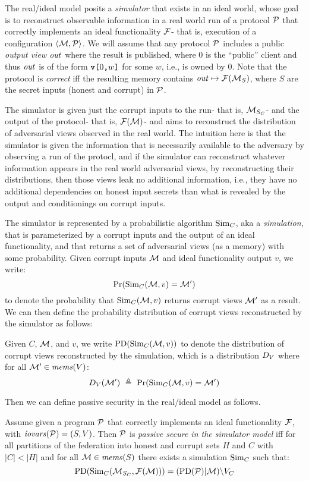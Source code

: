 The real/ideal model posits a \emph{simulator} that exists in an ideal
world, whose goal is to reconstruct observable information in a real
world run of a protocol $\mathcal{P}$ that correctly implements an ideal
functionality $\mathcal{F}$- that is, execution of a configuration
$\langle \mathcal{M},\mathcal{P} \rangle$. We will assume that any protocol $\mathcal{P}$
includes a public \emph{output view} $\mathit{out}$ where the result is
published, where $0$ is the ``public'' client and thus $\mathit{out}$
is of the form $\texttt{v[}0\texttt{,}w\texttt{]}$ for some $w$, i.e., is owned by 0.
Note that the protocol is \emph{correct} iff the resulting
memory contains $\mathit{out} \mapsto \mathcal{F}(\mathcal{M}_S)$, where $S$ are the
secret inputs (honest and corrupt) in $\mathcal{P}$.

The simulator is given just the corrupt inputs to the run- that is,
$\mathcal{M}_{S_C}$- and the output of the protocol- that is,
$\mathcal{F}(\mathcal{M})$- and aims to reconstruct the distribution of
adversarial views observed in the real world. The intuition here is
that the simulator is given the information that is necessarily
available to the adversary by observing a run of the protocl, and if
the simulator can reconstruct whatever information appears in the real
world adversarial views, by reconstructing their distributions, then
those views leak no additional information, i.e., they have no
additional dependencies on honest input secrets than what is revealed
by the output and conditionings on corrupt inputs.

The simulator is represented by a probabilistic algorithm $\mathrm{Sim}_C$,
aka a \emph{simulation}, that is parameterized by a corrupt inputs and
the output of an ideal functionality, and that returns a set of
adversarial views (as a memory) with some probability. Given
corrupt inputs $\mathcal{M}$ and ideal functionality output $v$,  
we write:
$$
\mathrm{Pr}(\mathrm{Sim}_C(\mathcal{M},v) = \mathcal{M}')
$$
to denote the probability that $\mathrm{Sim}_C(\mathcal{M},v)$
returns corrupt views $\mathcal{M}'$ as a result. We can then define the
probability distribution of corrupt views reconstructed
by the simulator as follows:
\begin{definition}
  Given $C$, $\mathcal{M}$, and $v$, we write $\mathrm{PD}(\mathrm{Sim}_C(\mathcal{M},v))$ to
  denote the distribution of corrupt views reconstructed by the
  simulation, which is a distribution $D_{V}$ where for
  all $\mathcal{M}' \in \mathit{mems}(V)$:
  $$
  D_{V}(\mathcal{M}')\ \triangleq\ \mathrm{Pr}(\mathrm{Sim}_C(\mathcal{M},v) = \mathcal{M}') 
  $$
\end{definition}

Then we can define passive security in the real/ideal
model as follows. 
\begin{definition}
  Assume given a program $\mathcal{P}$ that correctly implements an ideal
  functionality $\mathcal{F}$, with $\mathit{iovars}(\mathcal{P}) = (S,V)$.  Then $\mathcal{P}$
  is \emph{passive secure in the simulator model} iff for all
  partitions of the federation into honest and corrupt sets $H$ and $C$
  with $|C| < |H|$ and for all $\mathcal{M} \in \mathit{mems}(S)$ there exists a
  simulation $\mathrm{Sim}_C$ such that:
  $$
  \mathrm{PD}(\mathrm{Sim}_C(\mathcal{M}_{S_C},\mathcal{F}(\mathcal{M}))) = (\mathrm{PD}(\mathcal{P})|\mathcal{M})\backslash V_C
  $$
\end{definition}

